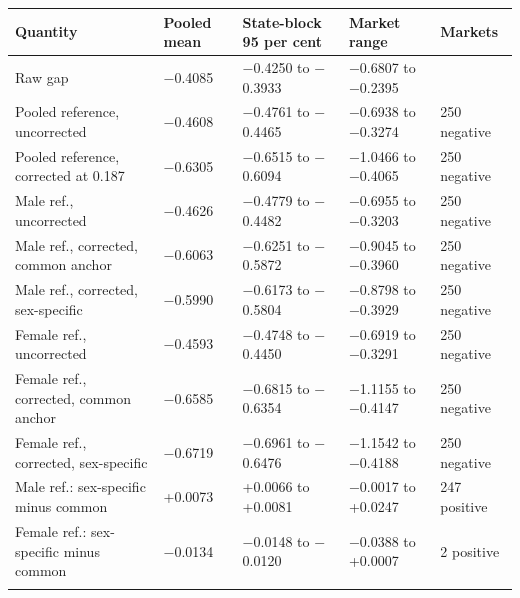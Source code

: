 \setlength{\tabcolsep}{2.5pt}
\begin{tabular}{@{}lllll@{}}
\toprule
Quantity & Pooled mean & State-block 95 per cent & Market range & Markets\\
\midrule
Raw gap & $-$0.4085 & $-$0.4250 to $-$0.3933 & $-$0.6807 to $-$0.2395 & \\
Pooled reference, uncorrected & $-$0.4608 & $-$0.4761 to $-$0.4465 & $-$0.6938 to $-$0.3274 & 250 negative\\
Pooled reference, corrected at 0.187 & $-$0.6305 & $-$0.6515 to $-$0.6094 & $-$1.0466 to $-$0.4065 & 250 negative\\
Male ref., uncorrected & $-$0.4626 & $-$0.4779 to $-$0.4482 & $-$0.6955 to $-$0.3203 & 250 negative\\
Male ref., corrected, common anchor & $-$0.6063 & $-$0.6251 to $-$0.5872 & $-$0.9045 to $-$0.3960 & 250 negative\\
Male ref., corrected, sex-specific & $-$0.5990 & $-$0.6173 to $-$0.5804 & $-$0.8798 to $-$0.3929 & 250 negative\\
Female ref., uncorrected & $-$0.4593 & $-$0.4748 to $-$0.4450 & $-$0.6919 to $-$0.3291 & 250 negative\\
Female ref., corrected, common anchor & $-$0.6585 & $-$0.6815 to $-$0.6354 & $-$1.1155 to $-$0.4147 & 250 negative\\
Female ref., corrected, sex-specific & $-$0.6719 & $-$0.6961 to $-$0.6476 & $-$1.1542 to $-$0.4188 & 250 negative\\
Male ref.: sex-specific minus common & +0.0073 & +0.0066 to +0.0081 & $-$0.0017 to +0.0247 & 247 positive\\
Female ref.: sex-specific minus common & $-$0.0134 & $-$0.0148 to $-$0.0120 & $-$0.0388 to +0.0007 & 2 positive\\
\botrule
\end{tabular}
